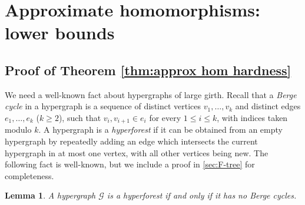 \documentclass[reqno, english, 12pt]{amsart}
\theoremstyle{plain}
\newtheorem{lemma}[theorem]{Lemma}
\theoremstyle{remark}
\renewcommand{\leq}{\leqslant}
\renewcommand{\geq}{\geqslant}
\begin{document}
	
\section{Approximate homomorphisms: lower bounds}\label{sec:approx hom hard}
\subsection{Proof of Theorem \ref{thm:approx hom hardness}}


	We need a well-known fact about hypergraphs of large girth. Recall that a {\em Berge cycle} in a hypergraph is a sequence of distinct vertices $v_1,\dots,v_k$ and distinct edges $e_1,\dots,e_k$ ($k \geq 2$), such that $v_i,v_{i+1} \in e_i$ for every $1 \leq i \leq k$, with indices taken modulo $k$. A hypergraph is a {\em hyperforest} if it can be obtained from an empty hypergraph by repeatedly adding an edge which intersects the current hypergraph in at most one vertex, with all other vertices being new. The following fact is well-known, but we include a proof in \cref{sec:F-tree} \nolinebreak for \nolinebreak completeness.

	\begin{lemma}\label{lem:hyperforest}
		A hypergraph $\mathcal{G}$ is a hyperforest if and only if it has no Berge cycles. 
	\end{lemma}
\end{document}
